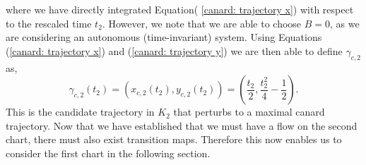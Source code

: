 where we have directly integrated Equation( \ref{canard: trajectory x}) with respect to the rescaled time $ t_2 $. However, we note that we are able to choose $B=0 $, as we are considering an autonomous (time-invariant) system. Using Equations (\ref{canard: trajectory x}) and (\ref{canard: trajectory y}) we are then able to define $ \gamma_{c,2} $ as, 
\begin{equation}
\gamma_{c,2}(t_2)=(x_{c,2}(t_2),y_{c,2}(t_2))=\left(\frac{t_2}{2},\frac{t^2_2}{4}-\frac{1}{2}\right).   \label{eq: gamma c2}
\end{equation}
This is the candidate trajectory in $K_2$ that perturbs to a maximal canard trajectory. Now that we have established that we must have a flow on the second chart, there must also exist transition maps. Therefore this now enables us to consider the first chart in the following section.


